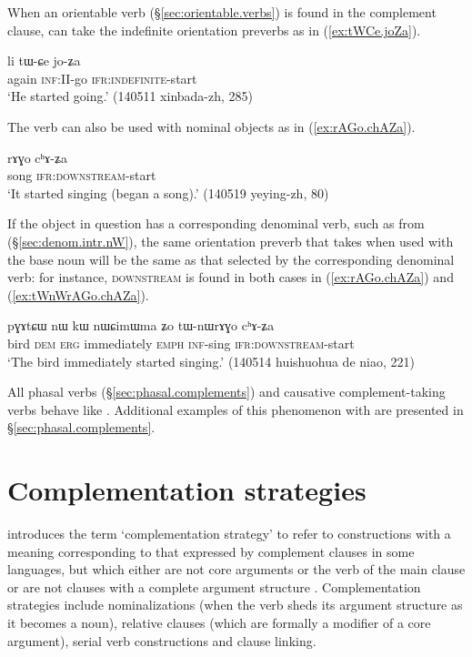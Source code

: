 When an orientable verb (§\ref{sec:orientable.verbs}) is found in the complement clause,  can take the indefinite orientation preverbs as in (\ref{ex:tWCe.joZa}).

\begin{exe} 
\ex \label{ex:tWCe.joZa}
\gll li tɯ-ɕe jo-ʑa \\
again \textsc{inf}:II-go \textsc{ifr}:\textsc{indefinite}-start \\
\glt `He started going.' (140511 xinbada-zh, 285)
\end{exe} 

The verb  can also be used with nominal objects as in (\ref{ex:rAGo.chAZa}). 

\begin{exe}
\ex \label{ex:rAGo.chAZa}
\gll rɤɣo cʰɤ-ʑa \\
song \textsc{ifr}:\textsc{downstream}-start \\
\glt `It started singing (began a song).' (140519 yeying-zh, 80)
\end{exe}

If the object in question has a corresponding denominal verb, such as  from  (§\ref{sec:denom.intr.nW}), the same orientation preverb that  takes when used with the base noun will be the same as that selected by the corresponding denominal verb: for instance, \textsc{downstream} is found in both cases in (\ref{ex:rAGo.chAZa}) and (\ref{ex:tWnWrAGo.chAZa}).


\begin{exe}
\ex \label{ex:tWnWrAGo.chAZa}
\gll pɣɤtɕɯ nɯ kɯ nɯɕimɯma ʑo tɯ-nɯrɤɣo cʰɤ-ʑa  \\
bird \textsc{dem} \textsc{erg} immediately \textsc{emph} \textsc{inf}-sing \textsc{ifr}:\textsc{downstream}-start \\
\glt `The bird immediately started singing.' (140514 huishuohua de niao, 221)
\end{exe}

All phasal verbs (§\ref{sec:phasal.complements}) and causative complement-taking verbs behave like . Additional examples of this phenomenon with  are presented in §\ref{sec:phasal.complements}.


\section{Complementation strategies}  \label{sec:strategies}
\citet{dixon06complementation} introduces the term `complementation strategy' to refer to constructions with a meaning corresponding to that expressed by complement clauses in some languages, but which either are not core arguments or the verb of the main clause or are not clauses with a complete argument structure \citep[34--40]{dixon06complementation}. Complementation strategies include nominalizations (when the verb sheds its argument structure as it becomes a noun), relative clauses (which are formally a modifier of a core argument), serial verb constructions and clause linking.

